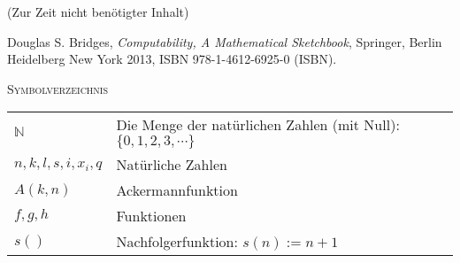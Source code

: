\documentclass[a4paper]{amsart}
\theoremstyle{definition}
\newcommand{\N}{\ensuremath{\mathbb{ N }}}
\begin{document}
\begin{backup}
    (Zur Zeit nicht benötigter Inhalt)
\end{backup}

\begin{thebibliography}{9}
   Douglas S. Bridges, \emph{Computability, A Mathematical Sketchbook},
   Springer, Berlin Heidelberg New York 2013, ISBN 978-1-4612-6925-0 (ISBN).

\end{thebibliography}

\begin{large}
    \centerline{\textsc{Symbolverzeichnis}}
\end{large}
\bigskip

\renewcommand*{\arraystretch}{1}

\begin{tabular}{ll}
    $\N$                    & Die Menge der natürlichen Zahlen (mit Null): $\{ 0, 1, 2, 3, \cdots \}$\\
    $n, k, l, s, i, x_i, q$ & Natürliche Zahlen\\
    $A( k, n )$             & Ackermannfunktion\\
    $f, g, h$               & Funktionen\\
    $s()$                   & Nachfolgerfunktion: $s(n) := n+1$

\end{tabular}
\end{document}
